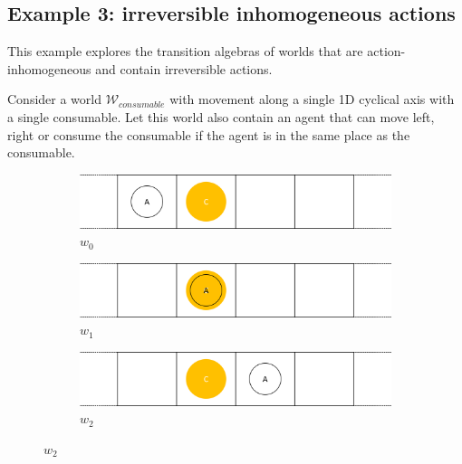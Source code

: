 \subsection{Example 3: irreversible inhomogeneous actions}\label{sec:identity irreversible inhomogeneous actions}

This example explores the transition algebras of worlds that are action-inhomogeneous and contain irreversible actions.

Consider a world $\mathscr{W}_{consumable}$ with movement along a single 1D cyclical axis with a single consumable.
Let this world also contain an agent that can move left, right or consume the consumable if the agent is in the same place as the consumable.

\begin{figure}[H]
  \centering
  \begin{subfigure}{0.48\textwidth}
    \centering
    \includegraphics[width=\textwidth]{5BeyondSBDRL/Old/Images/Consumable_world_states/w0.png}
    \caption{$w_{0}$}
    \label{fig:w0}
  \end{subfigure}%
  \hfill
  \begin{subfigure}{0.48\textwidth}
    \centering
    \includegraphics[width=\textwidth]{5BeyondSBDRL/Old/Images/Consumable_world_states/w1.png}
    \caption{$w_{1}$}
    \label{fig:w1}
  \end{subfigure}%
  \vspace{0.5cm}
  \begin{subfigure}{0.48\textwidth}
    \centering
    \includegraphics[width=\textwidth]{5BeyondSBDRL/Old/Images/Consumable_world_states/w2.png}
    \caption{$w_{2}$}
    \label{fig:w2}

\end{subfigure}
\end{figure}
